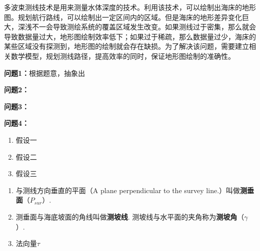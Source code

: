 \setcounter{page}{1}




多波束测线技术是用来测量水体深度的技术。利用该技术，可以绘制出海床的地形图。规划航行路线，可以绘制出一定区间内的区域。但是海床的地形差异变化巨大，深浅不一会导致测绘系统的覆盖区域发生改变。如果测线过于密集，那么就会导致数据量过大，地形图绘制效率低下；如果过于稀疏，那么数据量过少，海床的某些区域没有探测到，地形图的绘制就会存在缺损。为了解决该问题，需要建立相关数学模型，规划测线路径，提高效率的同时，保证地形图绘制的准确性。


\textbf{问题1：}根据题意，抽象出

\textbf{问题2：}

\textbf{问题3：}

\textbf{问题4：}







\begin{enumerate}
    \item 假设一
    \item 假设二
    \item 假设三
\end{enumerate}



\begin{enumerate}
    \item 与测线方向垂直的平面（A plane perpendicular to the survey line.）叫做\textbf{测垂面}（$P_{sur}$）.
    \item 测垂面与海底坡面的角线叫做\textbf{测坡线}. 测坡线与水平面的夹角称为\textbf{测坡角}（$\gamma$）.
    \item 法向量$\tau$
\end{enumerate}

